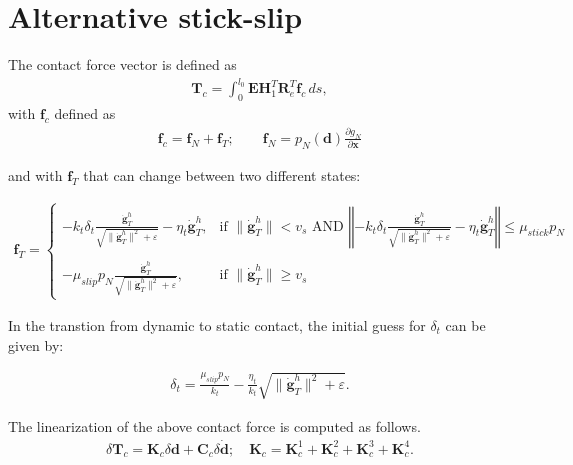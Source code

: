 \documentclass[3p]{elsarticle}
\newcommand{\vect}[1]{\boldsymbol{#1}}
\begin{document}
\section{Alternative stick-slip}
The contact force vector is defined as
\begin{align}
	\vect{T}_c = \int_0^{l_0}\vect{E}\vect{H}^T_1\vect{R}_e^T\vect{f}_c\,ds,
\end{align}
\noindent with $\vect{f}_c$ defined as
\begin{align}
	\vect{f}_c = \vect{f}_N + \vect{f}_T;\qquad \vect{f}_N =p_N(\vect{d})\frac{\partial g_N}{\partial\vect{x}}\label{eq:fc}
\end{align}

\noindent and with $\vect{f}_T$ that can change between two different states:

\begin{align}
\vect{f}_T = \left\{\begin{array}{ll}
	-k_t\delta_t\frac{\dot{\vect{g}}_T^h}{\sqrt{\|\dot{\vect{g}}_T^h\|^2+\varepsilon}}-\eta_t\dot{\vect{g}}_T^h,&\text{if }\|\dot{\vect{g}}_T^h\| < v_s\text{ AND }\left\Vert-k_t\delta_t\frac{\dot{\vect{g}}_T^h}{\sqrt{\|\dot{\vect{g}}_T^h\|^2+\varepsilon}}-\eta_t\dot{\vect{g}}_T^h\right\Vert\leq \mu_{stick}p_N\\
	&\\
	-\mu_{slip} p_N\frac{\dot{\vect{g}}_T^h}{\sqrt{\|\dot{\vect{g}}_T^h\|^2+\varepsilon}},&\text{if }\|\dot{\vect{g}}_T^h\| \geq v_s
\end{array}\right.
\end{align}

In the transtion from dynamic to static contact, the initial guess for $\delta_t$ can be given by:

\begin{align}
	\delta_t = \frac{\mu_{slip}p_N}{k_t}-\frac{\eta_t}{k_t}\sqrt{\|\dot{\vect{g}}_T^h\|^2+\varepsilon}.
\end{align}

The linearization of the above contact force is computed as follows.
\begin{align}
	\delta\vect{T}_c = \vect{K}_c\delta\vect{d}+\vect{C}_c\delta\dot{\vect{d}};\quad\vect{K}_c = \vect{K}_c^1+\vect{K}_c^2+\vect{K}_c^3+\vect{K}_c^4.\label{eq:deltaTc-app}
\end{align}
\end{document}
